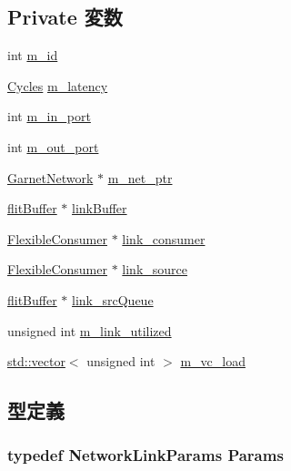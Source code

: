 \subsection*{Private 変数}
\begin{DoxyCompactItemize}
\item 
int \hyperlink{classNetworkLink_aad966617e7e050bedbead762727808a5}{m\_\-id}
\item 
\hyperlink{classCycles}{Cycles} \hyperlink{classNetworkLink_a7599697a6c831356525c7d97604edd31}{m\_\-latency}
\item 
int \hyperlink{classNetworkLink_a67a47daa432fd29dd37c5f1345f12916}{m\_\-in\_\-port}
\item 
int \hyperlink{classNetworkLink_a9b816056732f913b9f0558260b1d4410}{m\_\-out\_\-port}
\item 
\hyperlink{classGarnetNetwork}{GarnetNetwork} $\ast$ \hyperlink{classNetworkLink_a6f69c0ff922be798fa1cfce69f83244e}{m\_\-net\_\-ptr}
\item 
\hyperlink{classflitBuffer}{flitBuffer} $\ast$ \hyperlink{classNetworkLink_a6bcb945d7dbbef21afd32fafcc9eea9f}{linkBuffer}
\item 
\hyperlink{classFlexibleConsumer}{FlexibleConsumer} $\ast$ \hyperlink{classNetworkLink_a5ec818e50e833fabcb5d919de6caa00b}{link\_\-consumer}
\item 
\hyperlink{classFlexibleConsumer}{FlexibleConsumer} $\ast$ \hyperlink{classNetworkLink_a78ccd2c8fe56c87ee492d83d7e0cdcd0}{link\_\-source}
\item 
\hyperlink{classflitBuffer}{flitBuffer} $\ast$ \hyperlink{classNetworkLink_a5f206c4e595e07aa6912cb38e25a2db3}{link\_\-srcQueue}
\item 
unsigned int \hyperlink{classNetworkLink_a162630f24b6fc6b9e9ffe54d023c9104}{m\_\-link\_\-utilized}
\item 
\hyperlink{classstd_1_1vector}{std::vector}$<$ unsigned int $>$ \hyperlink{classNetworkLink_a929bb11421a47667a05e8e94e6d8ccd2}{m\_\-vc\_\-load}
\end{DoxyCompactItemize}


\subsection{型定義}
\hypertarget{classNetworkLink_a1da148687c9777c23a833785c588c749}{
\subsubsection[{Params}]{\setlength{\rightskip}{0pt plus 5cm}typedef NetworkLinkParams {\bf Params}}}
\label{classNetworkLink_a1da148687c9777c23a833785c588c749}


